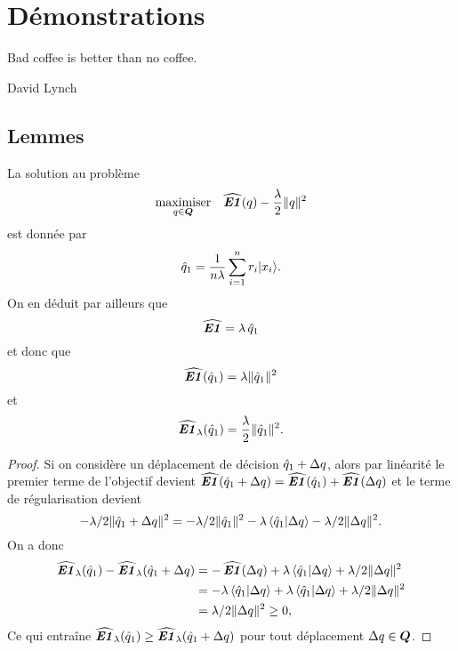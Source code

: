 \section{Démonstrations}
\label{sec:lemma}

\epigraph{Bad coffee is better than no coffee.}{David Lynch}

\subsection{Lemmes}
\label{sec:lems}

\begin{lemme}
  \label{lem:ndef}
  La solution au problème
  \begin{equation}
    \maximizeEquation[q \in \Q]{\hEN(q) - \frac{\lambda}{2}\|q\|^2}
  \end{equation}
  est donnée par
  \begin{equation}
    \qh_1 = \frac{1}{n\lambda}\sumi r_i|x_i\rangle.
  \end{equation}
  On en déduit par ailleurs que
  \begin{equation}
    \hEN = \lambda\,\qh_1
  \end{equation}
  et donc que
  \begin{equation}
    \hEN(\qh_1) = \lambda\|\qh_1\|^2
  \end{equation}
  et
  \begin{equation}
    \hEN_\lambda(\qh_1) = \frac{\lambda}{2}\|\qh_1\|^2.
  \end{equation}
\end{lemme}

\begin{proof}
  Si on considère un déplacement de décision $\qh_1 + \Delta q$, alors par linéarité le premier
  terme de l'objectif devient $\hEN(\qh_1+\Delta q) = \hEN(\qh_1) + \hEN(\Delta q)$ et le terme de
  régularisation devient
  \begin{equation}
    -\lambda/2\|\qh_1 + \Delta q\|^2 = -\lambda/2\|\qh_1\|^2 - \lambda\braket{\qh_1|\Delta q} - \lambda/2\|\Delta q\|^2.
  \end{equation}
  On a donc
  \begin{align}
    \hEN_\lambda(\qh_1)  - \hEN_\lambda(\qh_1+\Delta q) &= -\hEN(\Delta q) + \lambda\braket{\qh_1|\Delta q} + \lambda/2\|\Delta q\|^2\\
                                       &= -\lambda\braket{\qh_1|\Delta q} + \lambda\braket{\qh_1|\Delta q} +
                                         \lambda/2\|\Delta q\|^2\\
                                       &= \lambda/2\|\Delta q\|^2 \geq 0,
  \end{align}
  Ce qui entraîne $\hEN_\lambda(\qh_1) \geq \hEN_\lambda(\qh_1 + \Delta q)$ pour tout déplacement $\Delta q\in\Q$. 
\end{proof}


